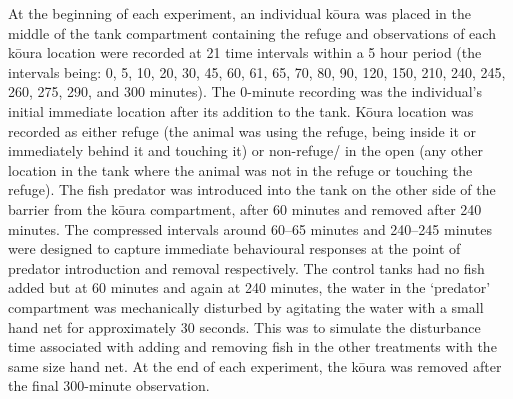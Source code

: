 \documentclass[
  letterpaper,
  DIV=11,
  numbers=noendperiod]{scrartcl}
\begin{document}
At the beginning of each experiment, an individual kōura was placed in
the middle of the tank compartment containing the refuge and
observations of each kōura location were recorded at 21 time intervals
within a 5 hour period (the intervals being: 0, 5, 10, 20, 30, 45, 60,
61, 65, 70, 80, 90, 120, 150, 210, 240, 245, 260, 275, 290, and 300
minutes). The 0-minute recording was the individual's initial immediate
location after its addition to the tank. Kōura location was recorded as
either refuge (the animal was using the refuge, being inside it or
immediately behind it and touching it) or non-refuge/ in the open (any
other location in the tank where the animal was not in the refuge or
touching the refuge). The fish predator was introduced into the tank on
the other side of the barrier from the kōura compartment, after 60
minutes and removed after 240 minutes. The compressed intervals around
60--65 minutes and 240--245 minutes were designed to capture immediate
behavioural responses at the point of predator introduction and removal
respectively. The control tanks had no fish added but at 60 minutes and
again at 240 minutes, the water in the `predator' compartment was
mechanically disturbed by agitating the water with a small hand net for
approximately 30 seconds. This was to simulate the disturbance time
associated with adding and removing fish in the other treatments with
the same size hand net. At the end of each experiment, the kōura was
removed after the final 300-minute observation.
\end{document}
